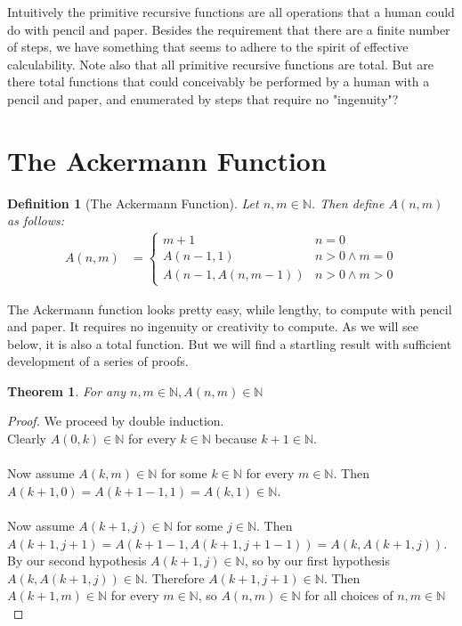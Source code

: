 \documentclass[12pt, letterpaper]{article}
\newtheorem{theorem}{Theorem}
\newtheorem*{definition}{Definition}
\theoremstyle{case}
\begin{document}
  Intuitively the primitive recursive functions are all operations that a human could do with pencil and paper.
  Besides the requirement that there are a finite number of steps, we have something that seems to adhere
  to the spirit of effective calculability. Note also that all primitive recursive functions are total.
  But are there total functions that could conceivably be performed by a human with a pencil and paper, and 
  enumerated by steps that require no "ingenuity"?

  \section{The Ackermann Function}
    \begin{definition}[The Ackermann Function]
      Let $n, m \in \mathbb{N}$. Then define $A(n, m)$ as follows:
      \begin{equation*}
        \begin{aligned}
          A(n, m) &=
          \begin{cases}
            m + 1                   & n = 0 \\
            A(n - 1, 1)             & n > 0 \wedge m = 0 \\
            A(n - 1, A(n, m - 1))   & n > 0 \wedge m > 0
          \end{cases}
        \end{aligned}
      \end{equation*}
    \end{definition}

    The Ackermann function looks pretty easy, while lengthy, to compute with pencil and paper. It requires no ingenuity
    or creativity to compute. As we will see below, it is also a total function. But we will find a startling result
    with sufficient development of a series of proofs.

    \begin{theorem}
      \label{inN}
      For any $n, m \in \mathbb{N}, A(n, m) \in \mathbb{N}$
    \end{theorem}
    \begin{proof}
      We proceed by double induction. \\
      Clearly $A(0, k) \in \mathbb{N}$ for every $k \in \mathbb{N}$ because $k + 1 \in \mathbb{N}$.
      \\
      \\
      Now assume $A(k, m) \in \mathbb{N}$ for some $k \in \mathbb{N}$ for every $m \in \mathbb{N}$.
      Then $A(k + 1, 0) = A(k + 1 - 1, 1) = A(k, 1) \in \mathbb{N}$.
      \\
      \\
      Now assume $A(k + 1, j) \in \mathbb{N}$ for some $j \in \mathbb{N}$.
      Then $A(k + 1, j + 1) = A(k + 1 - 1, A(k + 1, j + 1 - 1)) = A(k, A(k + 1, j))$.
      By our second hypothesis $A(k + 1, j) \in \mathbb{N}$, so by our first hypothesis $A(k, A(k + 1, j)) \in \mathbb{N}$.
      Therefore $A(k + 1, j + 1) \in \mathbb{N}$. Then $A(k + 1, m) \in \mathbb{N}$ for every $m \in \mathbb{N}$, so
      $A(n, m) \in \mathbb{N}$ for all choices of $n, m \in \mathbb{N}$
    \end{proof}
\end{document}
